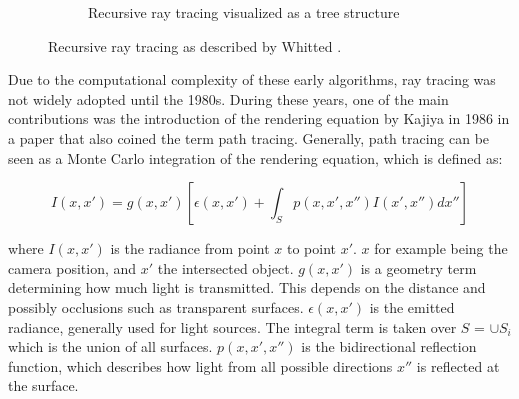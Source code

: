 \begin{figure}[H]
\begin{subfigure}[t]{0.45\textwidth}
    \caption{Recursive ray tracing visualized as a tree structure}
    \label{fig:recursiveTree}
  \end{subfigure}
  \caption{Recursive ray tracing as described by Whitted \cite{whittedGlobalIllumination}.}
  \label{fig:recursiveRayTracing}
\end{figure}

Due to the computational complexity of these early algorithms, ray tracing was not widely adopted until the 1980s. During these years, one of the main contributions was the introduction of the rendering equation by Kajiya in 1986 in a paper that also coined the term path tracing. Generally, path tracing can be seen as a Monte Carlo integration of the rendering equation, which is defined as:

\begin{equation}
  \label{eqn:rendering-equation}
  I(x, x') = g(x, x') [\epsilon(x, x') + \int_{S} p(x, x', x'')I(x', x'')dx'']
\end{equation}

where $I(x, x')$ is the radiance from point $x$ to point $x'$. $x$ for example being the camera position, and $x'$ the intersected object. $g(x, x')$ is a geometry term determining how much light is transmitted. This depends on the distance and possibly occlusions such as transparent surfaces. $\epsilon(x, x')$ is the emitted radiance, generally used for light sources. The integral term is taken over $S$ = $\cup S_i$ which is the union of all surfaces. $p(x, x', x'')$ is the bidirectional reflection function, which describes how light from all possible directions $x''$ is reflected at the surface. \cite{kajiya1986rendering}

